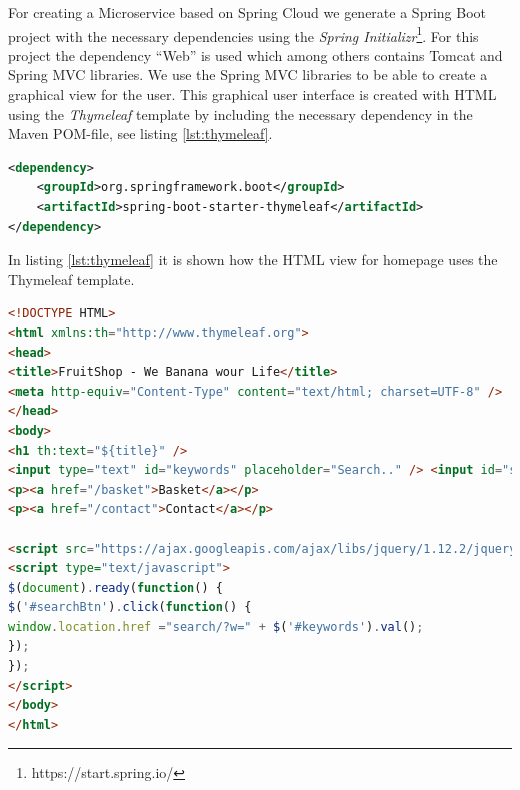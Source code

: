 For creating a Microservice based on Spring Cloud we generate a Spring Boot project with the necessary dependencies using the \emph{Spring Initializr}\footnote{https://start.spring.io/}. For this project the dependency ``Web'' is used which among others contains Tomcat and Spring MVC libraries. We use the Spring MVC libraries to be able to create a graphical view for the user. This graphical user interface is created with HTML using the \emph{Thymeleaf} template by including the necessary dependency in the Maven POM-file, see listing \ref{lst:thymeleaf}. 
\begin{lstlisting}[caption={Thymeleaf dependency in POM-file},label={lst:thymeleaf}, language=XML, frame=single, ]
<dependency>
	<groupId>org.springframework.boot</groupId>
	<artifactId>spring-boot-starter-thymeleaf</artifactId>
</dependency>
\end{lstlisting}
In listing \ref{lst:thymeleaf} it is shown how the HTML view for homepage uses the Thymeleaf template.
\begin{lstlisting}[caption={homepage.html},label={lst:thymeleaf-html}, language=HTML, frame=single, ]
<!DOCTYPE HTML>
<html xmlns:th="http://www.thymeleaf.org">
<head>
<title>FruitShop - We Banana wour Life</title>
<meta http-equiv="Content-Type" content="text/html; charset=UTF-8" />
</head>
<body>
<h1 th:text="${title}" />
<input type="text" id="keywords" placeholder="Search.." /> <input id="searchBtn" type="submit" value="Go"/>
<p><a href="/basket">Basket</a></p>
<p><a href="/contact">Contact</a></p>

<script src="https://ajax.googleapis.com/ajax/libs/jquery/1.12.2/jquery.min.js" />
<script type="text/javascript">
$(document).ready(function() {
$('#searchBtn').click(function() {
window.location.href ="search/?w=" + $('#keywords').val();
});
});
</script>
</body>
</html>
\end{lstlisting}

